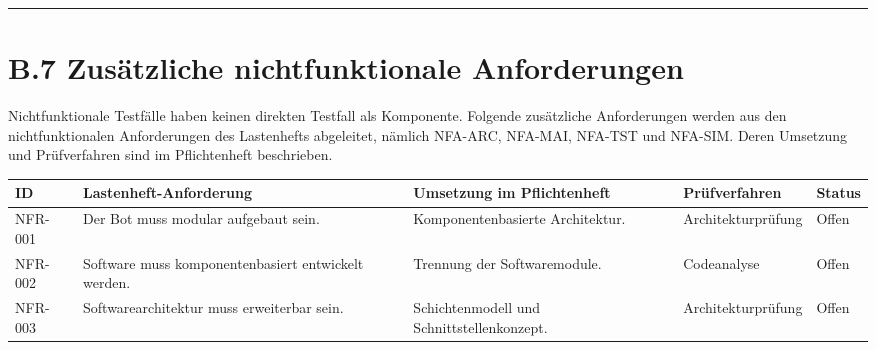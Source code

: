\documentclass[
]{article}
\begin{document}
\begin{center}\rule{0.5\linewidth}{0.5pt}\end{center}

\section{B.7 Zusätzliche nichtfunktionale
Anforderungen}\label{b.7-zusuxe4tzliche-nichtfunktionale-anforderungen}

Nichtfunktionale Testfälle haben keinen direkten Testfall als
Komponente. Folgende zusätzliche Anforderungen werden aus den
nichtfunktionalen Anforderungen des Lastenhefts abgeleitet, nämlich
NFA-ARC, NFA-MAI, NFA-TST und NFA-SIM. Deren Umsetzung und Prüfverfahren
sind im Pflichtenheft beschrieben.

\begin{longtable}[]{@{}
  >{\raggedright\arraybackslash}p{}
  >{\raggedright\arraybackslash}p{}
  >{\raggedright\arraybackslash}p{}
  >{\raggedright\arraybackslash}p{}
  >{\raggedright\arraybackslash}p{}@{}}
\toprule\noalign{}
\begin{minipage}[b]{\linewidth}\raggedright
ID
\end{minipage} & \begin{minipage}[b]{\linewidth}\raggedright
Lastenheft-Anforderung
\end{minipage} & \begin{minipage}[b]{\linewidth}\raggedright
Umsetzung im Pflichtenheft
\end{minipage} & \begin{minipage}[b]{\linewidth}\raggedright
Prüfverfahren
\end{minipage} & \begin{minipage}[b]{\linewidth}\raggedright
Status
\end{minipage} \\
\midrule\noalign{}
\endhead
\bottomrule\noalign{}
\endlastfoot
NFR-001 & Der Bot muss modular aufgebaut sein. & Komponentenbasierte
Architektur. & Architekturprüfung & Offen \\
NFR-002 & Software muss komponentenbasiert entwickelt werden. & Trennung
der Softwaremodule. & Codeanalyse & Offen \\
NFR-003 & Softwarearchitektur muss erweiterbar sein. & Schichtenmodell
und Schnittstellenkonzept. & Architekturprüfung & Offen \\

\end{longtable}
\end{document}

